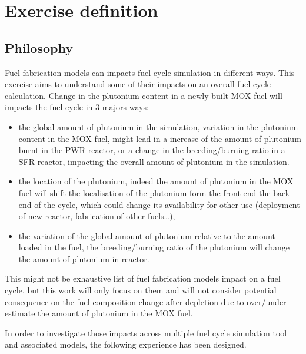 \section{Exercise definition}

\subsection{Philosophy}

Fuel fabrication models can impacts fuel cycle simulation in different ways.
This exercise aims to understand some of their impacts on an overall fuel cycle
calculation. Change in the plutonium content in a newly built MOX fuel will
impacts the fuel cycle in 3 majors ways:
\begin{itemize}
    \item the global amount of plutonium in the simulation, variation in the
        plutonium content in the MOX fuel, might lead in a increase of the
        amount of plutonium burnt in the PWR reactor, or a change in the
        breeding/burning ratio in a SFR reactor, impacting the overall amount of
        plutonium in the simulation.
    \item the location of the plutonium, indeed the amount of plutonium in the
        MOX fuel will shift the localisation of the plutonium form the front-end
        the back-end of the cycle, which could change its availability for
        other use (deployment of new reactor, fabrication of other fuels\ldots),
    \item the variation of the global amount of plutonium relative to the amount
        loaded in the fuel, the breeding/burning ratio of the plutonium will
        change the amount of plutonium in reactor.
\end{itemize}

This might not be exhaustive list of fuel fabrication models impact on a fuel
cycle, but this work will only focus on them and will not consider potential
consequence on the fuel composition change after depletion due to
over/under-estimate the amount of plutonium in the MOX fuel.

In order to investigate those impacts across multiple fuel cycle simulation tool
and associated models, the following experience has been designed.

